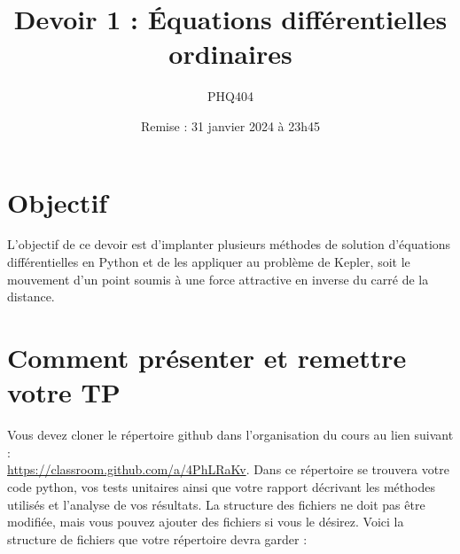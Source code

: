 \documentclass[12pt, letterpaper]{article}
\begin{document}
\title{Devoir 1 : Équations différentielles ordinaires}
\author{PHQ404}
\date{Remise : 31 janvier 2024 à 23h45}
\maketitle

\section{Objectif}\label{sec:objectif}

\noindent L'objectif de ce devoir est d'implanter plusieurs méthodes de solution
d'équations différentielles en Python 
et de les appliquer au problème de Kepler,
soit le mouvement d'un point soumis à une force attractive 
en inverse du carré de la distance.


\section{Comment présenter et remettre votre TP}\label{sec:comment-presenter-et-remettre-votre-tp}

\noindent Vous devez cloner le répertoire github dans l'organisation du cours au lien suivant :\\
\href{https://classroom.github.com/a/4PhLRaKv}{https://classroom.github.com/a/4PhLRaKv}.
Dans ce répertoire se trouvera votre code python, vos tests unitaires ainsi que votre rapport
décrivant les méthodes utilisés et l'analyse de vos résultats.
La structure des fichiers ne doit pas être modifiée, mais vous pouvez ajouter des fichiers si vous le désirez.
Voici la structure de fichiers que votre répertoire devra garder :

\bigskip
\end{document}
